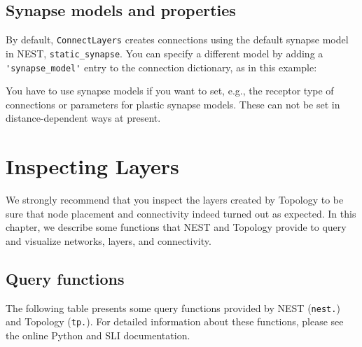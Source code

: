 \documentclass[a4paper,12pt]{report}
\begin{document}
\section{Synapse models and properties}\label{sec:conn_synapse}

By default, \lstinline!ConnectLayers! creates connections using the
default synapse model in NEST,
\lstinline!static_synapse!. You can specify a different model by
adding a \lstinline!'synapse_model'! entry to the connection
dictionary, as in this example:

You have to use synapse models if you want to set, e.g., the receptor
type of connections or parameters for plastic synapse models. These
can not be set in distance-dependent ways at present.


\chapter{Inspecting Layers}\label{sec:inspection}

We strongly recommend that you inspect the layers created by Topology
to be sure that node placement and connectivity indeed turned out as
expected. In this chapter, we describe some functions that NEST and
Topology provide to query and visualize networks, layers, and
connectivity.

\section{Query functions}\label{sec:queries}

The following table presents some query functions provided by NEST
(\lstinline!nest.!) and Topology (\lstinline!tp.!). For detailed
information about these functions, please see the online Python and
SLI documentation. 
\end{document}
